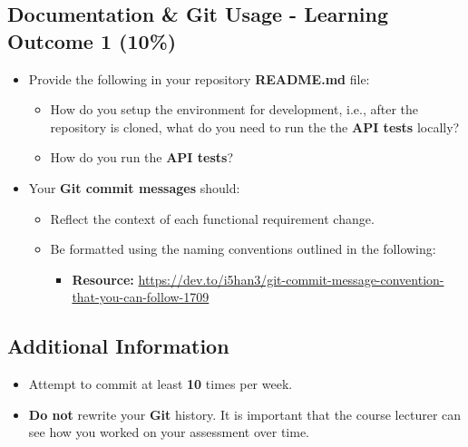 \documentclass{article}
\begin{document}
\subsection*{Documentation \& Git Usage - Learning Outcome 1 (10\%)}
\begin{itemize}
    \item Provide the following in your repository \textbf{README.md} file:
          \begin{itemize}
            \item How do you setup the environment for development, i.e., after the repository is cloned, what do you need to run the the \textbf{API tests} locally?
            \item How do you run the \textbf{API tests}?
          \end{itemize}
\end{itemize}
\begin{itemize}
    \item Your \textbf{Git commit messages} should:
          \begin{itemize}
            \item Reflect the context of each functional requirement change. 
            \item Be formatted using the naming conventions outlined in the following:
                  \begin{itemize}
                    \item \textbf{Resource:} \small\href{https://dev.to/i5han3/git-commit-message-convention-that-you-can-follow-1709}{https://dev.to/i5han3/git-commit-message-convention-that-you-can-follow-1709}
                  \end{itemize} 
          \end{itemize}
\end{itemize}
          
\subsection*{Additional Information}
\begin{itemize}
    \item Attempt to commit at least \textbf{10} times per week.
    \item \textbf{Do not} rewrite your \textbf{Git} history. It is important that the course lecturer can see how you worked on your assessment over time. 
\end{itemize} 
\end{document}
